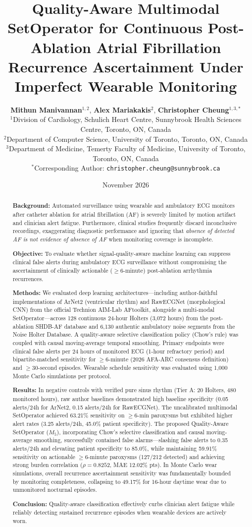 \documentclass[10pt,twocolumn,letterpaper]{article}
\title{\Large\textbf{Quality-Aware Multimodal SetOperator for Continuous Post-Ablation Atrial Fibrillation Recurrence Ascertainment Under Imperfect Wearable Monitoring}}
\author{
  \textbf{Mithun Manivannan}$^{1,2}$, \textbf{Alex Mariakakis}$^{2}$, \textbf{Christopher Cheung}$^{1,3,*}$ \\[0.5em]
  \small $^{1}$Division of Cardiology, Schulich Heart Centre, Sunnybrook Health Sciences Centre, Toronto, ON, Canada \\
  \small $^{2}$Department of Computer Science, University of Toronto, Toronto, ON, Canada \\
  \small $^{3}$Department of Medicine, Temerty Faculty of Medicine, University of Toronto, Toronto, ON, Canada \\
  \small $^{*}$Corresponding Author: \texttt{christopher.cheung@sunnybrook.ca}
}
\date{November 2026}
\begin{document}
\maketitle

\begin{abstract}
\textbf{Background:} Automated surveillance using wearable and ambulatory ECG monitors after catheter ablation for atrial fibrillation (AF) is severely limited by motion artifact and clinician alert fatigue. Furthermore, clinical studies frequently discard inconclusive recordings, exaggerating diagnostic performance and ignoring that \emph{absence of detected AF is not evidence of absence of AF} when monitoring coverage is incomplete.

\textbf{Objective:} To evaluate whether signal-quality-aware machine learning can suppress clinical false alerts during ambulatory ECG surveillance without compromising the ascertainment of clinically actionable ($\ge 6$-minute) post-ablation arrhythmia recurrences.

\textbf{Methods:} We evaluated deep learning architectures—including author-faithful implementations of ArNet2 (ventricular rhythm) and RawECGNet (morphological CNN) from the official Technion AIM-Lab AFtoolkit, alongside a multi-modal SetOperator—across 128 continuous 24-hour Holters (3,072 hours) from the post-ablation SHDB-AF database and 6,130 authentic ambulatory noise segments from the Noise Holter Database. A quality-aware selective classification policy (Chow's rule) was coupled with causal moving-average temporal smoothing. Primary endpoints were clinical false alerts per 24 hours of monitored ECG (1-hour refractory period) and bipartite-matched sensitivity for $\ge 6$-minute (2026 AFA-ARC consensus definition) and $\ge 30$-second episodes. Wearable schedule sensitivity was evaluated using 1,000 Monte Carlo simulations per protocol.

\textbf{Results:} In negative controls with verified pure sinus rhythm (Tier A: 20 Holters, 480 monitored hours), raw author baselines demonstrated high baseline specificity (0.05 alerts/24h for ArNet2, 0.15 alerts/24h for RawECGNet). The uncalibrated multimodal SetOperator achieved 63.21\% sensitivity on $\ge 6$-min paroxysms but exhibited higher alert rates (3.25 alerts/24h, 45.0\% patient specificity). The proposed Quality-Aware SetOperator ($M_5$), incorporating Chow's selective classification and causal moving-average smoothing, successfully contained false alarms—slashing false alerts to 0.35 alerts/24h and elevating patient specificity to 85.0\%, while maintaining 59.91\% sensitivity on actionable $\ge 6$-minute paroxysms (127/212 detected) and achieving strong burden correlation ($\rho = 0.8252$, MAE 12.02\% pts). In Monte Carlo wear simulations, overall recurrence ascertainment sensitivity was fundamentally bounded by monitoring completeness, collapsing to 49.17\% for 16-hour daytime wear due to unmonitored nocturnal episodes.

\textbf{Conclusion:} Quality-aware classification effectively curbs clinician alert fatigue while reliably detecting sustained recurrence episodes when wearable devices are actively worn.
\end{abstract}
\end{document}
